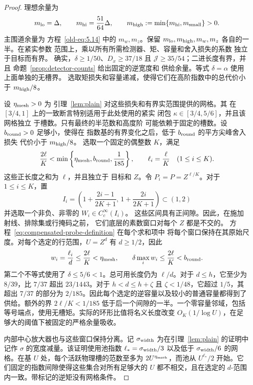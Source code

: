 \documentclass[11pt,a4paper]{article}
\numberwithin{equation}{section}
\numberwithin{figure}{section}
\theoremstyle{definition}
\theoremstyle{remark}
\begin{document}
\begin{proof}
理想余量为
\[
 m_{\rm lo}=\Delta,\qquad m_{\rm hi}=\frac{51}{64}\Delta,\qquad
 m_{\rm high}:=\min\{m_{\rm hi},m_{\rm small}\}>0.
\]
主围道余量为
方程~\eqref{old-eq:5.14} 中的 \(m_w,m_z\)。保留
\(m_{\rm lo},m_{\rm high},m_w,m_z\) 各自的一半。在紧实参数
范围上，乘以所有所需检测器、矩、容量和舍入损失的系数
独立于目标而有界。
确实，\(\delta\ge1/50\)、\(D_x\ge37/18\) 且
\(\mathcal J\ge35/54\)；二进长度有界，并且
命题~\ref{prop:detector-counts} 给出固定的逆宽度和
供给余量。等式 \(\delta=\alpha\) 使用上面单独的无槽界。
选取矩损失和容量递减，使得它们在高阶指数中的总代价小于
\(m_{\rm high}/8\)。

设 \(\eta_{\rm mesh}>0\) 为
引理~\ref{lem:plain} 对这些损失和有界实范围提供的网格。其
在 \([3/4,1]\) 上的一致断言特别适用于此处使用的紧实
闭包 \(\kappa\in[3/4,5/6]\)，并且该网格独立
于槽数。只有最终的半范数和高度阶
可能依赖于固定的槽数。设 \(b_{\rm round}>0\) 足够小，使得在
指数基的有界变化之后，低于 \(b_{\rm round}\) 的平方尖峰舍入损失
代价小于 \(m_{\rm high}/8\)。
选取一个固定的偶整数 \(K\)，满足
\[
 \frac{2\ell}{K}<
 \min\left\{\eta_{\rm mesh},b_{\rm round},\frac1{185}\right\},
 \qquad \ell_i=\frac{\ell}{K}\quad(1\le i\le K).
\]
这些正长度之和为 \(\ell\)，并且独立于
目标和 \(Z\)。令 \(P_i=P=Z^{\ell/K}\)。对于 \(1\le i\le K\)，置
\[
 I_i=\left(1+\frac{2i-1}{2K+1},\,1+\frac{2i}{2K+1}\right)\subset(1,2)
\]
并选取一个非负、非零的 \(W_i\in C_c^\infty(I_i)\)。
这些区间具有正间隙。因此，在施加射线、排除集或行掩码之前，
它们底层的素数窗口对每个 \(Z\) 都是不交的。
方程~\eqref{eq:compensated-probe-definition} 在每个求和项中
将每个窗口保持在其原始尺度。对每个选定的行范围，\(U=Z^d\) 有 \(d\ge1/2\)，因此
\[
 w_i=\frac{\ell_i}{d}\le\frac{2\ell}{K}<\eta_{\rm mesh},
 \qquad
 \delta\max_iw_i\le\frac{2\ell}{K}<b_{\rm round}.
\]
第二个不等式使用了 \(\delta\le5/6<1\)。总可用长度仍为 \(\ell/d\)。对于 \(d\le h\)，它至少为 \(8/39\)，比 \(7/37\) 超出 \(23/1443\)。对于 \(h<d\le h+\zeta\) 且 \(\zeta<1/48\)，它超过 \(1/5\)，其超出 \(7/37\) 的部分为 \(2/185\)。因此每个选定的逆容量以及较小的普通容量都得到了供给。额外的界 \(2\ell/K<1/185\) 低于后一个间隙的一半。一个零容量邻域，包括等号端点，使用无槽矩。实际的环形比值将名义长度改变 \(O_K(1/\log U)\)，在足够大的阈值下被固定的严格余量吸收。

内部中心放大器也与这些窗口保持分离。记 \(\sigma_{\rm width}\) 为在引理~\ref{lem:plain} 的证明中记作 \(\sigma\) 的宽度减量。该证明使用池指数 \(\ell_*=\sigma_{\rm width}/3\) 以及低于 \(\sigma_{\rm width}/6\) 的网格。在基 \(U\) 处，每个活跃物理槽的范数至多为 \(2U^{\eta_{\rm mesh}}\)，而池从 \(U^{\ell_*}/2\) 开始。它们固定的指数间隙使得这些集合对所有足够大的 \(U\) 都不相交，且在选定的 \(d\)-范围内一致。带标记的逆矩没有网格条件。


\end{proof}
\end{document}
